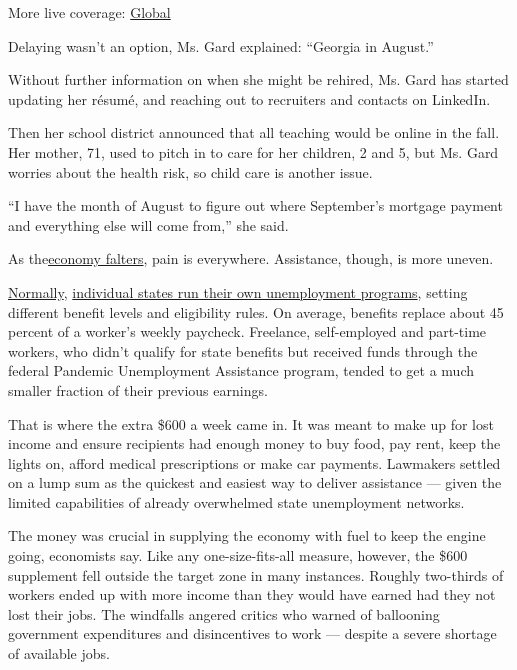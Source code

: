 More live coverage:
\href{https://www.nytimes3xbfgragh.onion/2020/08/04/world/coronavirus-cases.html?action=click\&pgtype=Article\&state=default\&region=MAIN_CONTENT_1\&context=storylines_live_updates}{Global}

Delaying wasn't an option, Ms. Gard explained: ``Georgia in August.''

Without further information on when she might be rehired, Ms. Gard has
started updating her résumé, and reaching out to recruiters and contacts
on LinkedIn.

Then her school district announced that all teaching would be online in
the fall. Her mother, 71, used to pitch in to care for her children, 2
and 5, but Ms. Gard worries about the health risk, so child care is
another issue.

``I have the month of August to figure out where September's mortgage
payment and everything else will come from,'' she said.

As
the\href{https://www.nytimes3xbfgragh.onion/2020/07/23/business/economy/unemployment-economy-coronavirus.html}{economy
falters}, pain is everywhere. Assistance, though, is more uneven.

\href{https://www.cbpp.org/research/economy/policy-basics-unemployment-insurance}{Normally},
\href{https://www.cbpp.org/research/economy/policy-basics-how-many-weeks-of-unemployment-compensation-are-available}{individual
states run their own unemployment programs}, setting different benefit
levels and eligibility rules. On average, benefits replace about 45
percent of a worker's weekly paycheck. Freelance, self-employed and
part-time workers, who didn't qualify for state benefits but received
funds through the federal Pandemic Unemployment Assistance program,
tended to get a much smaller fraction of their previous earnings.

That is where the extra \$600 a week came in. It was meant to make up
for lost income and ensure recipients had enough money to buy food, pay
rent, keep the lights on, afford medical prescriptions or make car
payments. Lawmakers settled on a lump sum as the quickest and easiest
way to deliver assistance --- given the limited capabilities of already
overwhelmed state unemployment networks.

The money was crucial in supplying the economy with fuel to keep the
engine going, economists say. Like any one-size-fits-all measure,
however, the \$600 supplement fell outside the target zone in many
instances. Roughly two-thirds of workers ended up with more income than
they would have earned had they not lost their jobs. The windfalls
angered critics who warned of ballooning government expenditures and
disincentives to work --- despite a severe shortage of available jobs.

